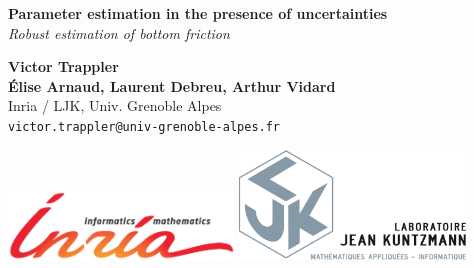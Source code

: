 \documentclass[a0,portrait, 30pt]{a0poster}
\begin{document}

{\veryHuge \color{NavyBlue} \textbf{Parameter estimation in the presence of uncertainties} \color{Black} \\\Huge\textit{Robust estimation of bottom friction}\\[2cm]} %

\begin{minipage}[b]{0.5\linewidth}

\huge \textbf{Victor Trappler\\ Élise Arnaud, Laurent Debreu, Arthur Vidard}\\[0.5cm] %
\huge Inria / LJK, Univ. Grenoble Alpes\\[0.4cm] %
\Large \texttt{victor.trappler@univ-grenoble-alpes.fr}
\end{minipage}
%
\begin{minipage}[t]{0.5\linewidth}
\includegraphics[width = 0.45\textwidth]{../Slides/Figures/INRIA_SCIENTIFIQUE_UK_CMJN}
\includegraphics[width= 0.45\textwidth]{../Slides/Figures/ljk}
\end{minipage}

\vspace{1cm} %

\end{document}
